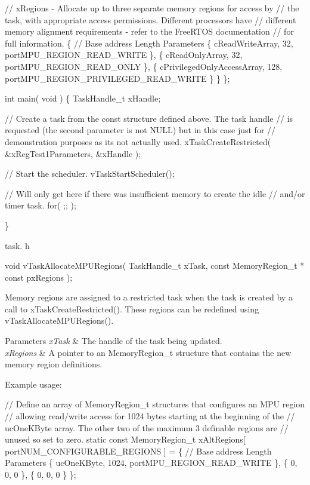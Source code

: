 \begin{DoxyPre}    // xRegions - Allocate up to three separate memory regions for access by
    // the task, with appropriate access permissions.  Different processors have
    // different memory alignment requirements - refer to the FreeRTOS documentation
    // for full information.
    \{
        // Base address                 Length  Parameters
        \{ cReadWriteArray,              32,     portMPU\_REGION\_READ\_WRITE \},
        \{ cReadOnlyArray,               32,     portMPU\_REGION\_READ\_ONLY \},
        \{ cPrivilegedOnlyAccessArray,   128,    portMPU\_REGION\_PRIVILEGED\_READ\_WRITE \}
    \}
\};\end{DoxyPre}



\begin{DoxyPre}int main( void )
\{
TaskHandle\_t xHandle;
\begin{DoxyVerb}// Create a task from the const structure defined above.  The task handle
// is requested (the second parameter is not NULL) but in this case just for
// demonstration purposes as its not actually used.
xTaskCreateRestricted( &xRegTest1Parameters, &xHandle );

// Start the scheduler.
vTaskStartScheduler();

// Will only get here if there was insufficient memory to create the idle
// and/or timer task.
for( ;; );
\end{DoxyVerb}

\}
   \end{DoxyPre}


task. h 
\begin{DoxyPre}
 void vTaskAllocateMPURegions( TaskHandle\_t xTask, const MemoryRegion\_t * const pxRegions );\end{DoxyPre}


Memory regions are assigned to a restricted task when the task is created by a call to x\+Task\+Create\+Restricted(). These regions can be redefined using v\+Task\+Allocate\+M\+P\+U\+Regions().


\begin{DoxyParams}{Parameters}
{\em x\+Task} & The handle of the task being updated.\\
\hline
{\em x\+Regions} & A pointer to an Memory\+Region\+\_\+t structure that contains the new memory region definitions.\\
\hline
\end{DoxyParams}
Example usage\+: 
\begin{DoxyPre}
// Define an array of MemoryRegion\_t structures that configures an MPU region
// allowing read/write access for 1024 bytes starting at the beginning of the
// ucOneKByte array.  The other two of the maximum 3 definable regions are
// unused so set to zero.
static const MemoryRegion\_t xAltRegions[ portNUM\_CONFIGURABLE\_REGIONS ] =
\{
    // Base address     Length      Parameters
    \{ ucOneKByte,       1024,       portMPU\_REGION\_READ\_WRITE \},
    \{ 0,                0,          0 \},
    \{ 0,                0,          0 \}
\};\end{DoxyPre}



